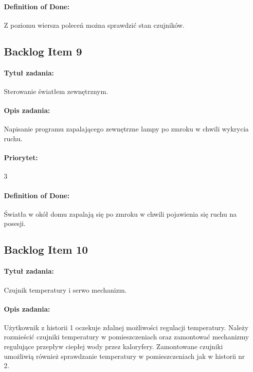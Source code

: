 	\paragraph{Definition of Done:}
	Z poziomu wiersza poleceń można sprawdzić stan czujników.
	


	\subsection{Backlog Item 9}
	\paragraph{Tytuł zadania:}
	Sterowanie światłem zewnętrznym.
	
	\paragraph{Opis zadania:} 
	Napisanie programu zapalającego zewnętrzne lampy po zmroku w chwili wykrycia ruchu. 
	
	\paragraph{Priorytet:}
	3
	
	\paragraph{Definition of Done:}
	Światła w okół domu zapalają się po zmroku w chwili pojawienia się ruchu na posesji.



	\subsection{Backlog Item 10}
	\paragraph{Tytuł zadania:}
	Czujnik temperatury i serwo mechanizm.
	
	\paragraph{Opis zadania:} 
	Użytkownik z historii 1 oczekuje zdalnej możliwości regulacji temperatury. Należy rozmieścić czujniki temperatury w pomieszczeniach oraz zamontować mechanizmy regulujące przepływ ciepłej wody przez kaloryfery. Zamontowane czujniki umożliwią również sprawdzanie temperatury w pomieszczeniach jak w historii nr 2.
	
